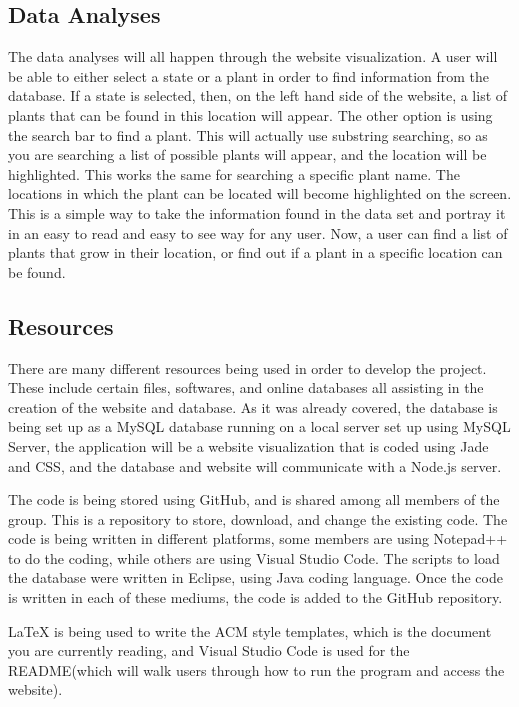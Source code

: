 \documentclass{Group6_Phase2}
\begin{document}
\subsection{Data Analyses}
The data analyses will all happen through the website visualization. A user will be able to either select a state or a plant in order to find information from the database. If a state is selected, then, on the left hand side of the website, a list of plants that can be found in this location will appear. The other option is using the search bar to find a plant. This will actually use substring searching, so as you are searching a list of possible plants will appear, and the location will be highlighted. This works the same for searching a specific plant name. The locations in which the plant can be located will become highlighted on the screen. This is a simple way to take the information found in the data set and portray it in an easy to read and easy to see way for any user. Now, a user can find a list of plants that grow in their location, or find out if a plant in a specific location can be found. 

\subsection{Resources}
There are many different resources being used in order to develop the project. These include certain files, softwares, and online databases all assisting in the creation of the website and database. As it was already covered, the database is being set up as a MySQL database running on a local server set up using MySQL Server, the application will be a website visualization that is coded using Jade and CSS, and the database and website will communicate with a Node.js server. 

The code is being stored using GitHub, and is shared among all members of the group. This is a repository to store, download, and change the existing code. The code is being written in different platforms, some members are using Notepad++ to do the coding, while others are using Visual Studio Code. The scripts to load the database were written in Eclipse, using Java coding language. Once the code is written in each of these mediums, the code is added to the GitHub repository. 

LaTeX is being used to write the ACM style templates, which is the document you are currently reading, and Visual Studio Code is used for the README(which will walk users through how to run the program and access the website).
\end{document}
